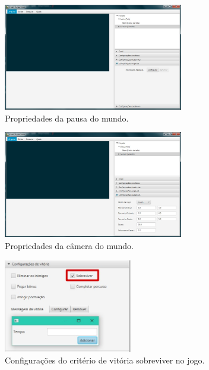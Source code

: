 \documentclass[12pt,oneside,openright,a4paper,english,brazil,sumario=tradicional]{abntex2}
\begin{document}
\begin{anexosenv}
   \begin{figure}[H]
   \centering
   \includegraphics[width=0.7\textwidth]{images/add_mundo_5.jpg}
   \caption{Propriedades da pausa do mundo.}
   \label{fig:add_mundo_5}
   \end{figure}

   \begin{figure}[H]
   \centering
   \includegraphics[width=0.7\textwidth]{images/add_mundo_6.jpg}
   \caption{Propriedades da câmera do mundo.}
   \label{fig:add_mundo_6}
   \end{figure}

   \begin{figure}[H]
   \centering
   \includegraphics[width=0.5\textwidth]{images/vitoria_sobreviver.jpg}
   \caption{Configurações do critério de vitória sobreviver no jogo.}
   \label{fig:vitoria_sobreviver}
   \end{figure}


\end{anexosenv}
\end{document}
